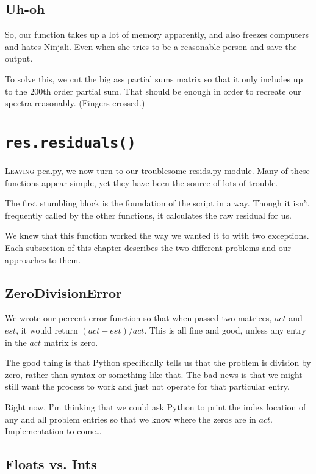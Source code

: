 \documentclass{article}
\begin{document}
\subsection{Uh-oh}
\label{sec:99problems}

So, our function takes up a lot of memory apparently, and also freezes
computers and hates Ninjali.  Even when she tries to be a reasonable
person and save the output.

To solve this, we cut the big ass partial sums matrix so that it only
includes up to the 200th order partial sum.  That should be enough in
order to recreate our spectra reasonably.  (Fingers crossed.)

\section{\texttt{res.residuals()}}
\label{sec:residuals}
\textsc{Leaving} pca.py, we now turn to our troublesome resids.py
module.  Many of these functions appear simple, yet they have been the
source of lots of trouble.

The first stumbling block is the foundation of the script in a way.
Though it isn't frequently called by the other functions, it
calculates the raw residual for us.

We knew that this function worked the way we wanted it to with two
exceptions.  Each subsection of this chapter describes the two
different problems and our approaches to them.

\subsection{ZeroDivisionError}
\label{sec:zerodivision}
We wrote our percent error function so that when passed two matrices,
$act$ and $est$, it would return $(act - est)/act$.  This is all fine
and good, unless any entry in the $act$ matrix is zero.

The good thing is that Python specifically tells us that the problem
is division by zero, rather than syntax or something like that.  The
bad news is that we might still want the process to work and just not
operate for that particular entry.

Right now, I'm thinking that we could ask Python to print the index
location of any and all problem entries so that we know where the
zeros are in $act$.  Implementation to come\ldots

\subsection{Floats vs. Ints}
\label{sec:float}
\end{document}
